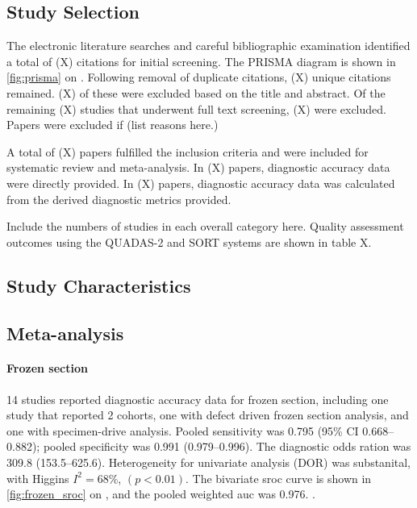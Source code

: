 \subsection{Study Selection}

The electronic literature searches and careful bibliographic examination identified a total of (X) citations for initial screening.
The PRISMA diagram is shown in \cref{fig:prisma} on .
Following removal of duplicate citations, (X) unique citations remained.
(X) of these were excluded based on the title and abstract.
Of the remaining (X) studies that underwent full text screening, (X) were excluded.
Papers were excluded if (list reasons here.)

A total of (X) papers fulfilled the inclusion criteria and were included for systematic review and meta-analysis.
In (X) papers, diagnostic accuracy data were directly provided. 
In (X) papers, diagnostic accuracy data was calculated from the derived diagnostic metrics provided.

Include the numbers of studies in each overall category here.
Quality assessment outcomes using the QUADAS-2 and SORT systems are shown in table X.




\subsection{Study Characteristics}

\subsection{Meta-analysis}

\paragraph{Frozen section}

14 studies reported diagnostic accuracy data for frozen section, including one study \cite{amitImprovingRateNegative2016} that reported 2 cohorts, one with defect driven frozen section analysis, and one with specimen-drive analysis.
Pooled sensitivity was 0.795 (95\% CI 0.668--0.882); pooled specificity was 0.991 (0.979--0.996).
The diagnostic odds ration was 309.8 (153.5--625.6).
Heterogeneity for univariate analysis (DOR) was substanital, with Higgins $I^2 = 68\%$, $(p<0.01)$.
The bivariate \gls{sroc} curve is shown in \cref{fig:frozen_sroc} on , and the pooled weighted \gls{auc} was 0.976. 
.

